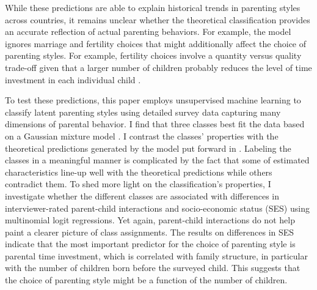 While these predictions are able to explain historical trends in parenting styles across countries, it remains unclear whether the theoretical classification provides an accurate reflection of actual parenting behaviors. For example, the model ignores marriage and fertility choices that might additionally affect the choice of parenting styles. For example, fertility choices involve a quantity versus quality trade-off given that a larger number of children probably reduces the level of time investment in each individual child \textcite{beckerTreatiseFamily1981}.

To test these predictions, this paper employs unsupervised machine learning to classify latent parenting styles using detailed survey data capturing many dimensions of parental behavior. I find that three classes best fit the data based on a Gaussian mixture model \parencite[e.g.][]{hastieElementsStatisticalLearning2009}. I contrast the classes' properties with the theoretical predictions generated by the model put forward in \textcite{doepkeParentingStyleAltruism2017}. Labeling the classes in a meaningful manner is complicated by the fact that some of estimated characteristics line-up well with the theoretical predictions while others contradict them. To shed more light on the classification's properties, I investigate whether the different classes are associated with differences in interviewer-rated parent-child interactions and socio-economic status (SES) using multinomial logit regressions. Yet again, parent-child interactions do not help paint a clearer picture of class assignments. The results on differences in SES indicate that the most important predictor for the choice of parenting style is parental time investment, which is correlated with family structure, in particular with the number of children born before the surveyed child. This suggests that the choice of parenting style might be a function of the number of children.


